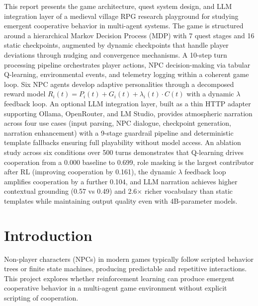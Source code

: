 \documentclass[12pt, a4paper, oneside]{report}
\begin{document}
This report presents the game architecture, quest system design, and LLM integration layer of a medieval village RPG research playground for studying emergent cooperative behavior in multi-agent systems. The game is structured around a hierarchical Markov Decision Process (MDP) with 7 quest stages and 16 static checkpoints, augmented by dynamic checkpoints that handle player deviations through nudging and convergence mechanisms. A 10-step turn processing pipeline orchestrates player actions, NPC decision-making via tabular Q-learning, environmental events, and telemetry logging within a coherent game loop. Six NPC agents develop adaptive personalities through a decomposed reward model $R_i(t) = P_i(t) + G_i(t) + \lambda_i(t) \cdot C(t)$ with a dynamic $\lambda$ feedback loop. An optional LLM integration layer, built as a thin HTTP adapter supporting Ollama, OpenRouter, and LM Studio, provides atmospheric narration across four use cases (input parsing, NPC dialogue, checkpoint generation, narration enhancement) with a 9-stage guardrail pipeline and deterministic template fallbacks ensuring full playability without model access. An ablation study across six conditions over 500 turns demonstrates that Q-learning drives cooperation from a 0.000 baseline to 0.699, role masking is the largest contributor after RL (improving cooperation by 0.161), the dynamic $\lambda$ feedback loop amplifies cooperation by a further 0.104, and LLM narration achieves higher contextual grounding (0.57 vs 0.49) and 2.6$\times$ richer vocabulary than static templates while maintaining output quality even with 4B-parameter models.

\clearpage
\tableofcontents
\listoffigures
{}
\listoftables
{}

\clearpage
{}
\setcounter{page}{1}

\chapter{Introduction}
\label{chap:introduction}

Non-player characters (NPCs) in modern games typically follow scripted behavior trees or finite state machines, producing predictable and repetitive interactions. This project explores whether reinforcement learning can produce emergent cooperative behavior in a multi-agent game environment without explicit scripting of cooperation.
\end{document}
